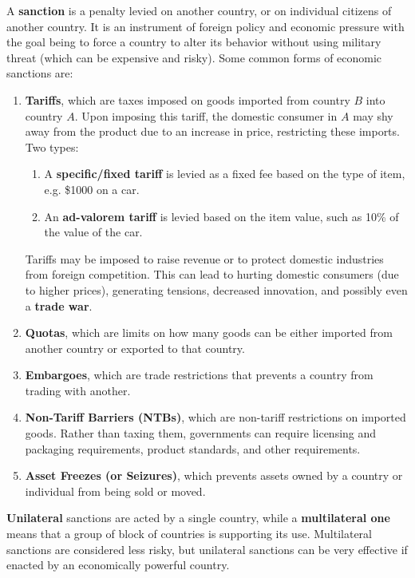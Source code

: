 \documentclass{article}
\begin{document}
  \begin{definition}
    \label{def:economic-sanctions}
    A \textbf{sanction} is a penalty levied on another country, or on individual citizens of another country. It is an instrument of foreign policy and economic pressure with the goal being to force a country to alter its behavior without using military threat (which can be expensive and risky). Some common forms of economic sanctions are: 
    \begin{enumerate}
        \item \textbf{Tariffs}, which are taxes imposed on goods imported from country $B$ into country $A$. Upon imposing this tariff, the domestic consumer in $A$ may shy away from the product due to an increase in price, restricting these imports. Two types: 
        \begin{enumerate}
            \item A \textbf{specific/fixed tariff} is levied as a fixed fee based on the type of item, e.g. \$1000 on a car. 
            \item An \textbf{ad-valorem tariff} is levied based on the item value, such as 10\% of the value of the car. 
        \end{enumerate}
        Tariffs may be imposed to raise revenue or to protect domestic industries from foreign competition. This can lead to hurting domestic consumers (due to higher prices), generating tensions, decreased innovation, and possibly even a \textbf{trade war}. 
        \item \textbf{Quotas}, which are limits on how many goods can be either imported from another country or exported to that country. 
        \item \textbf{Embargoes}, which are trade restrictions that prevents a country from trading with another. 
        \item \textbf{Non-Tariff Barriers (NTBs)}, which are non-tariff restrictions on imported goods. Rather than taxing them, governments can require licensing and packaging requirements, product standards, and other requirements. 
        \item \textbf{Asset Freezes (or Seizures)}, which prevents assets owned by a country or individual from being sold or moved. 
    \end{enumerate}
    \textbf{Unilateral} sanctions are acted by a single country, while a \textbf{multilateral one} means that a group of block of countries is supporting its use. Multilateral sanctions are considered less risky, but unilateral sanctions can be very effective if enacted by an economically powerful country. 
  \end{definition}
\end{document}
